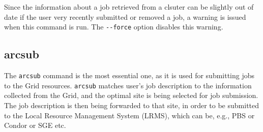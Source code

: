 Since  the  information  about  a job retrieved from a clsuter can be slightly out of date if the user very recently
submitted or removed a job, a warning is issued when this command is run. The \verb#--force# option disables this warning.



\subsection{arcsub}\label{sec:arcsub}
The \texttt{arcsub} command is the
most essential one, as it is used for submitting jobs to the Grid
resources. \texttt{arcsub} matches user's job
description to the information collected from the Grid, and the
optimal site is being selected for job submission. The job description
is then being forwarded to that site, in order to be submitted to the
Local Resource Management System (LRMS), which can be, e.g., PBS or
Condor or SGE etc.


